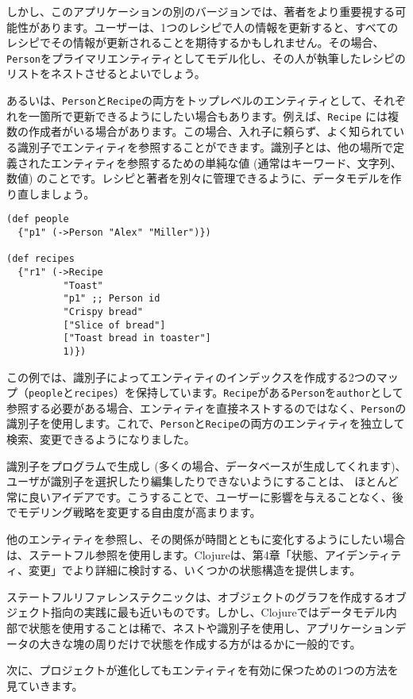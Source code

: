 しかし、このアプリケーションの別のバージョンでは、著者をより重要視する可能性があります。ユーザーは、1つのレシピで人の情報を更新すると、すべてのレシピでその情報が更新されることを期待するかもしれません。その場合、\texttt{Person}をプライマリエンティティとしてモデル化し、その人が執筆したレシピのリストをネストさせるとよいでしょう。

あるいは、\texttt{Person}と\texttt{Recipe}の両方をトップレベルのエンティティとして、それぞれを一箇所で更新できるようにしたい場合もあります。例えば、\texttt{Recipe} には複数の作成者がいる場合があります。この場合、入れ子に頼らず、よく知られている識別子でエンティティを参照することができます。識別子とは、他の場所で定義されたエンティティを参照するための単純な値 (通常はキーワード、文字列、数値) のことです。レシピと著者を別々に管理できるように、データモデルを作り直しましょう。

\begin{lstlisting}[numbers=none]
(def people
  {"p1" (->Person "Alex" "Miller")})

(def recipes
  {"r1" (->Recipe
          "Toast"
          "p1" ;; Person id
          "Crispy bread"
          ["Slice of bread"]
          ["Toast bread in toaster"]
          1)})
\end{lstlisting}

この例では、識別子によってエンティティのインデックスを作成する2つのマップ（\texttt{people}と\texttt{recipes}）を保持しています。\texttt{Recipe}がある\texttt{Person}を\texttt{author}として参照する必要がある場合、エンティティを直接ネストするのではなく、\texttt{Person}の識別子を使用します。これで、\texttt{Person}と\texttt{Recipe}の両方のエンティティを独立して検索、変更できるようになりました。

識別子をプログラムで生成し (多くの場合、データベースが生成してくれます)、 ユーザが識別子を選択したり編集したりできないようにすることは、 ほとんど常に良いアイデアです。こうすることで、ユーザーに影響を与えることなく、後でモデリング戦略を変更する自由度が高まります。

他のエンティティを参照し、その関係が時間とともに変化するようにしたい場合は、ステートフル参照を使用します。Clojureは、第4章「状態、アイデンティティ、変更」でより詳細に検討する、いくつかの状態構造を提供します。

ステートフルリファレンステクニックは、オブジェクトのグラフを作成するオブジェクト指向の実践に最も近いものです。しかし、Clojureではデータモデル内部で状態を使用することは稀で、ネストや識別子を使用し、アプリケーションデータの大きな塊の周りだけで状態を作成する方がはるかに一般的です。

次に、プロジェクトが進化してもエンティティを有効に保つための1つの方法を見ていきます。

